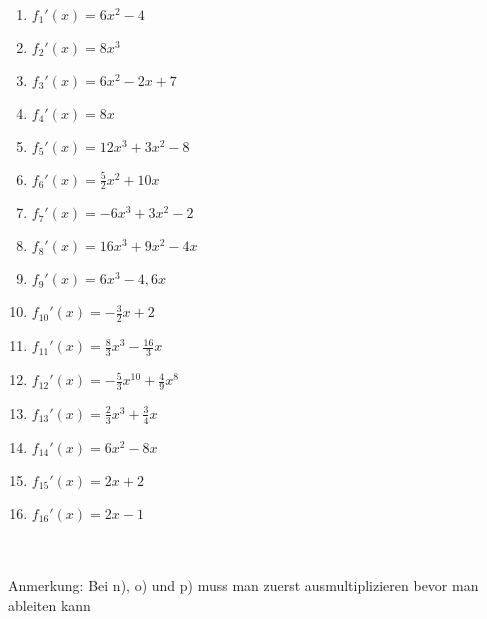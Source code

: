 \begin{Answer}[ref=summenregelA1]\\
	\begin{minipage}{\textwidth}
		\begin{minipage}{0.5\textwidth}
			\begin{enumerate}[label=\alph*)]
				\item \(f_1'(x)=6x^2-4\)
				\item \(f_2'(x)=8x^3\)
				\item \(f_3'(x)=6x^2-2x+7\)
				\item \(f_4'(x)=8x\)
				\item \(f_5'(x)=12x^3+3x^2-8\)
				\item \(f_6'(x)=\frac{5}{2}x^2+10x\)
				\item \(f_7'(x)=-6x^3+3x^2-2\)
				\item \(f_8'(x)=16x^3+9x^2-4x\)
			\end{enumerate}
		\end{minipage}
		\begin{minipage}{0.5\textwidth}
			\begin{enumerate}[label=\alph*)]
				\setcounter{enumi}{8}
				\item \(f_9'(x)=6x^3-4,6x\)
				\item \(f_{10}'(x)=-\frac{3}{2}x+2\)
				\item \(f_{11}'(x)=\frac{8}{3}x^3-\frac{16}{3}x\)
				\item \(f_{12}'(x)=-\frac{5}{3}x^{10}+\frac{4}{9}x^8\)
				\item \(f_{13}'(x)=\frac{2}{3}x^3+\frac{3}{4}x\)
				\item \(f_{14}'(x)=6x^2-8x\)
				\item \(f_{15}'(x)=2x+2\)
				\item \(f_{16}'(x)=2x-1\)
			\end{enumerate}
		\end{minipage}
	\end{minipage}\\  \\
	Anmerkung: Bei n), o) und p) muss man zuerst ausmultiplizieren bevor man ableiten kann
\end{Answer}